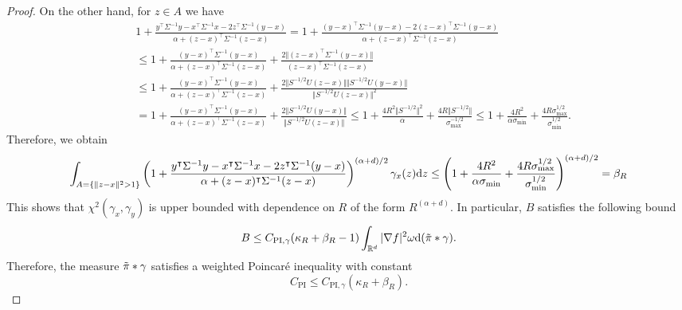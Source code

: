 \begin{proof}
On the other hand, for $z\in A$ we have
\begin{align*}
    &1+\frac{y^{\intercal}\Sigma^{-1}y-x^{\intercal}\Sigma^{-1}x-2z^{\intercal}\Sigma^{-1}(y-x)}{\alpha + (z-x)^{\intercal}\Sigma^{-1}(z-x)} = 1+\frac{(y-x)^{\intercal}\Sigma^{-1}(y-x)-2(z-x)^{\intercal}\Sigma^{-1}(y-x)}{\alpha + (z-x)^{\intercal}\Sigma^{-1}(z-x)} \\
    & \leq 1 + \frac{(y-x)^{\intercal}\Sigma^{-1}(y-x)}{\alpha + (z-x)^{\intercal}\Sigma^{-1}(z-x)} + \frac{2\Vert (z-x)^{\intercal}\Sigma^{-1}(y-x)\Vert }{ (z-x)^{\intercal}\Sigma^{-1}(z-x)}\\
    & \leq 1 + \frac{(y-x)^{\intercal}\Sigma^{-1}(y-x)}{\alpha + (z-x)^{\intercal}\Sigma^{-1}(z-x)} + \frac{2\Vert S^{-1/2}U(z-x)\Vert\Vert S^{-1/2}U(y-x)\Vert }{ \Vert S^{-1/2}U(z-x)\Vert^2}\\
    & = 1 + \frac{(y-x)^{\intercal}\Sigma^{-1}(y-x)}{\alpha + (z-x)^{\intercal}\Sigma^{-1}(z-x)} + \frac{2\Vert S^{-1/2}U(y-x)\Vert }{ \Vert S^{-1/2}U(z-x)\Vert} \leq 1 + \frac{4R^2 \Vert S^{-1/2}\Vert^2}{\alpha} + \frac{4R\Vert S^{-1/2}\Vert }{\sigma_{\max}^{-1/2}}\leq 1 + \frac{4R^2}{\alpha\sigma_{\min}} + \frac{4R\sigma_{\max}^{1/2}}{\sigma_{\min}^{1/2}}.
\end{align*}
Therefore, we obtain
\begin{equation*}
    \int_{A=\{\Vert z-x\Vert^2 > 1\}}\left(1+\frac{y^{\intercal}\Sigma^{-1}y-x^{\intercal}\Sigma^{-1}x-2z^{\intercal}\Sigma^{-1}(y-x)}{\alpha + (z-x)^{\intercal}\Sigma^{-1}(z-x)}\right)^{(\alpha+d)/2}\gamma_x(z)\mathrm{d} z\leq \left( 1 + \frac{4R^2}{\alpha\sigma_{\min}} + \frac{4R\sigma_{\max}^{1/2}}{\sigma_{\min}^{1/2}}\right)^{(\alpha+d)/2} = \beta_R
\end{equation*}
This shows that $\chi^2(\gamma_x, \gamma_y)$ is upper bounded with dependence on $R$ of the form $R^{(\alpha+d)}$. In particular, $B$ satisfies the following bound
\begin{equation*}
    B\leq  C_{\text{PI}, \gamma} (\kappa_R + \beta_R -1)\int_{\mathbb{R}^d} \vert\nabla f\vert^2 \omega \mathrm{d}(\Tilde{\pi}*\gamma).
\end{equation*}
Therefore, the measure $\Tilde{\pi}*\gamma$ satisfies a weighted Poincaré inequality with constant 
\begin{equation*}
    C_{\text{PI}} \leq C_{\text{PI}, \gamma} (\kappa_R + \beta_R).
\end{equation*}

\end{proof}